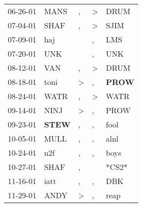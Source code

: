 \begin{supertabular}{p{0.07\textwidth}p{0.06\textwidth}p{0.02\textwidth}p{0.02\textwidth}p{0.06\textwidth}}
          06-26-01\textsuperscript{} &           MANS\textsuperscript{} &                , &     \textgreater &           DRUM\textsuperscript{} \\
          07-04-01\textsuperscript{} &           SHAF\textsuperscript{} &                , &     \textgreater &           SJIM\textsuperscript{} \\
          07-09-01\textsuperscript{} &            haj\textsuperscript{} &                  &                , &            LMS\textsuperscript{} \\
          07-20-01\textsuperscript{} &            UNK\textsuperscript{} &                  &                , &            UNK\textsuperscript{} \\
          08-12-01\textsuperscript{} &            VAN\textsuperscript{} &                , &     \textgreater &           DRUM\textsuperscript{} \\
          08-18-01\textsuperscript{} &           toni\textsuperscript{} &     \textgreater &                , &  \textbf{PROW\textsuperscript{}} \\
          08-24-01\textsuperscript{} &           WATR\textsuperscript{} &                , &     \textgreater &           WATR\textsuperscript{} \\
          09-14-01\textsuperscript{} &           NINJ\textsuperscript{} &     \textgreater &                , &           PROW\textsuperscript{} \\
          09-23-01\textsuperscript{} &  \textbf{STEW\textsuperscript{}} &                , &                , &           fool\textsuperscript{} \\
          10-05-01\textsuperscript{} &           MULL\textsuperscript{} &                , &                , &           alnl\textsuperscript{} \\
          10-24-01\textsuperscript{} &            n2f\textsuperscript{} &                , &                , &           boys\textsuperscript{} \\
          10-27-01\textsuperscript{} &           SHAF\textsuperscript{} &                , &                  &                            *CS2* \\
          11-16-01\textsuperscript{} &           iatt\textsuperscript{} &                , &                , &            DBK\textsuperscript{} \\
          11-29-01\textsuperscript{} &           ANDY\textsuperscript{} &     \textgreater &                , &           reap\textsuperscript{} \\

\end{supertabular}
